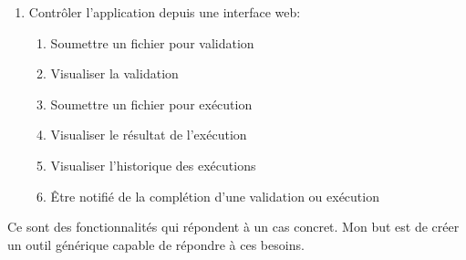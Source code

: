 \begin{enumerate}
\begin{enumerate}
    \end{enumerate}
    \item Contrôler l'application depuis une interface web:
    \begin{enumerate}
        \item Soumettre un fichier pour validation
        \item Visualiser la validation
        \item Soumettre un fichier pour exécution
        \item Visualiser le résultat de l'exécution
        \item Visualiser l'historique des exécutions
        \item Être notifié de la complétion d'une validation ou exécution
    \end{enumerate}
\end{enumerate}

Ce sont des fonctionnalités qui répondent à un cas concret.
Mon but est de créer un outil générique capable de répondre à ces besoins.
